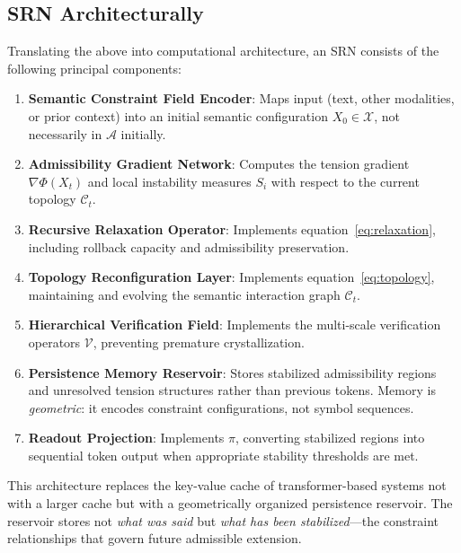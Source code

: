 \documentclass[11pt, a4paper]{article}
\theoremstyle{srn}
\theoremstyle{srnremark}
\newcommand{\Aspace}{\mathcal{A}}           %
\newcommand{\Cstruct}{\mathcal{C}}           %
\newcommand{\Phiten}{\varPhi}            %
\begin{document}
\subsection{SRN Architecturally}

Translating the above into computational architecture, an SRN consists
of the following principal components:

\begin{enumerate}
  \item \textbf{Semantic Constraint Field Encoder}: Maps input
    (text, other modalities, or prior context) into an initial
    semantic configuration $X_0 \in \mathcal{X}$, not necessarily
    in $\Aspace$ initially.

  \item \textbf{Admissibility Gradient Network}: Computes the
    tension gradient $\nabla\Phiten(X_t)$ and local instability measures
    $S_i$ with respect to the current topology $\Cstruct_t$.

  \item \textbf{Recursive Relaxation Operator}: Implements
    equation~\eqref{eq:relaxation}, including rollback capacity and
    admissibility preservation.

  \item \textbf{Topology Reconfiguration Layer}: Implements
    equation~\eqref{eq:topology}, maintaining and evolving the
    semantic interaction graph $\Cstruct_t$.

  \item \textbf{Hierarchical Verification Field}: Implements the
    multi-scale verification operators $\mathcal{V}$, preventing
    premature crystallization.

  \item \textbf{Persistence Memory Reservoir}: Stores stabilized
    admissibility regions and unresolved tension structures rather than
    previous tokens.
    Memory is \emph{geometric}: it encodes constraint configurations,
    not symbol sequences.

  \item \textbf{Readout Projection}: Implements $\pi$, converting
    stabilized regions into sequential token output when appropriate
    stability thresholds are met.
\end{enumerate}

This architecture replaces the key-value cache of transformer-based
systems not with a larger cache but with a geometrically organized
persistence reservoir.
The reservoir stores not \emph{what was said} but \emph{what has been
stabilized}---the constraint relationships that govern future
admissible extension.
\end{document}

